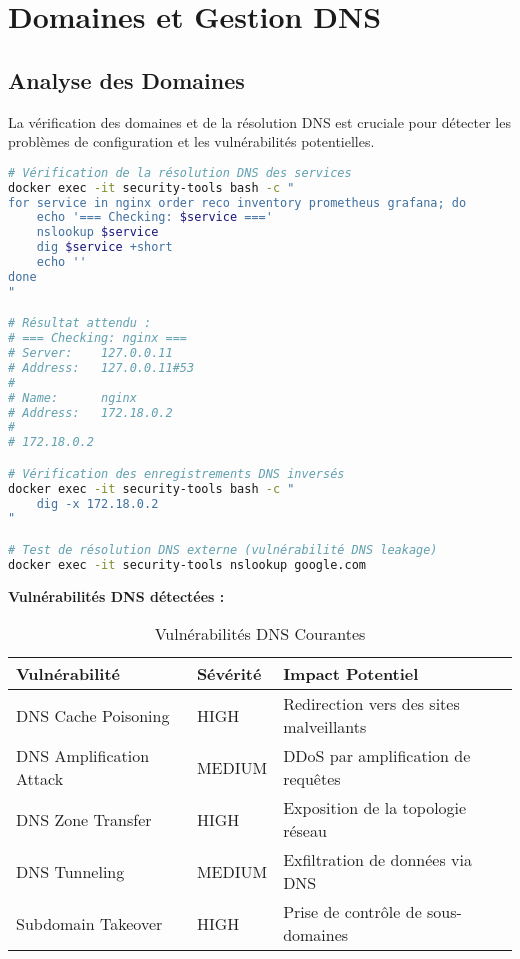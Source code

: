\documentclass[11pt,a4paper]{report}
\begin{document}
\section{Domaines et Gestion DNS}

\subsection{Analyse des Domaines}

La vérification des domaines et de la résolution DNS est cruciale pour détecter les problèmes de configuration et les vulnérabilités potentielles.

\begin{lstlisting}[language=bash, caption=Analyse des Domaines et DNS]
# Vérification de la résolution DNS des services
docker exec -it security-tools bash -c "
for service in nginx order reco inventory prometheus grafana; do
    echo '=== Checking: $service ==='
    nslookup $service
    dig $service +short
    echo ''
done
"

# Résultat attendu :
# === Checking: nginx ===
# Server:    127.0.0.11
# Address:   127.0.0.11#53
# 
# Name:      nginx
# Address:   172.18.0.2
# 
# 172.18.0.2

# Vérification des enregistrements DNS inversés
docker exec -it security-tools bash -c "
    dig -x 172.18.0.2
"

# Test de résolution DNS externe (vulnérabilité DNS leakage)
docker exec -it security-tools nslookup google.com
\end{lstlisting}

\textbf{Vulnérabilités DNS détectées :}

\begin{table}[H]
\centering
\caption{Vulnérabilités DNS Courantes}
\label{tab:dns_vulnerabilities}
\begin{tabular}{|p{4cm}|p{3cm}|p{6cm}|}
\hline
\textbf{Vulnérabilité} & \textbf{Sévérité} & \textbf{Impact Potentiel} \\
\hline
DNS Cache Poisoning & HIGH & Redirection vers des sites malveillants \\
\hline
DNS Amplification Attack & MEDIUM & DDoS par amplification de requêtes \\
\hline
DNS Zone Transfer & HIGH & Exposition de la topologie réseau \\
\hline
DNS Tunneling & MEDIUM & Exfiltration de données via DNS \\
\hline
Subdomain Takeover & HIGH & Prise de contrôle de sous-domaines \\
\hline
\end{tabular}
\end{table}
\end{document}
